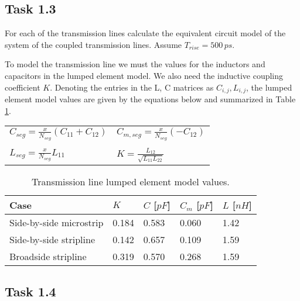 \documentclass[../main.tex]{subfiles}
\begin{document}
\newpage

\subsection{Task 1.3}

For each of the transmission lines calculate the equivalent circuit model of the system of the coupled transmission lines. Assume $T_{rise} = 500\,\si{ps}$.

\solution

To model the transmission line we must the values for the inductors and capacitors in the lumped element model. We also need the inductive coupling coefficient $K$. Denoting the entries in the L, C matrices as $C_{i,j}, L_{i,j}$, the lumped element model values are given by the equations below and summarized in Table \ref{tab:tl-params}.

\begin{table}[h]
    \centering
    \begin{tabular}{l l}
        $C_{seg} = \frac{x}{N_{seg}} \left( C_{11} + C_{12} \right)$ & $C_{m, seg} = \frac{x}{N_{seg}} (-C_{12})$ \\
        & \\
        $L_{seg} = \frac{x}{N_{seg}} L_{11}$ & $K = \frac{L_{12}}{\sqrt{L_{11}L_{22}}}$ \\
    \end{tabular}
\end{table}

\begin{table}[h]
    \centering
    \begin{tabular}{l|l l l l}
        \toprule[1pt]
        \textbf{Case} & $K$ & $C$ [$\si{pF}$] & $C_m$ [$\si{pF}$] & $L$ [$\si{nH}$] \\
        \midrule
        Side-by-side microstrip & 0.184 & 0.583 & 0.060 & 1.42 \\
        Side-by-side stripline  & 0.142 & 0.657 & 0.109 & 1.59 \\
        Broadside stripline     & 0.319 & 0.570 & 0.268 & 1.59 \\
        \bottomrule[1pt]
    \end{tabular}
    \caption{Transmission line lumped element model values.}
    \label{tab:tl-params}
\end{table}

\subsection{Task 1.4}
\end{document}
